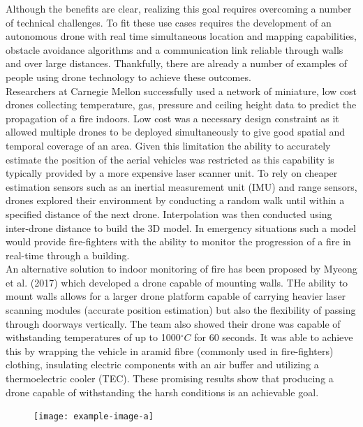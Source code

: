 \documentclass[capstone_report.tex]{subfiles}
\begin{document}
    Although the benefits are clear, realizing this goal requires overcoming a number of technical challenges.  To fit these use cases requires the development of an autonomous drone with real time simultaneous location and mapping capabilities, obstacle avoidance algorithms and a communication link reliable through walls and over large distances.
    Thankfully, there are already a number of examples of people using drone technology to achieve these outcomes.\\

    Researchers at Carnegie Mellon \cite{purohit2011sensorfly} successfully used a network of miniature, low cost drones collecting temperature, gas, pressure and ceiling height data to predict the propagation of a fire indoors.  Low cost was a necessary design constraint as it allowed multiple drones to be deployed simultaneously to give good spatial and temporal coverage of an area.  Given this limitation the ability to accurately estimate the position of the aerial vehicles was restricted as this capability is typically provided by a more expensive laser scanner unit.  To rely on cheaper estimation sensors such as an inertial measurement unit (IMU) and range sensors, drones explored their environment by conducting a random walk until within a specified distance of the next drone.  Interpolation was then conducted using inter-drone distance to build the 3D model.  In emergency situations such a model would provide fire-fighters with the ability to monitor the progression of a fire in real-time through a building.\\

    An alternative solution to indoor monitoring of fire has been proposed by Myeong et al. (2017) \cite{myeong2017development} which developed a drone capable of mounting walls.  THe ability to mount walls allows for a larger drone platform capable of carrying heavier laser scanning modules (accurate position estimation) but also the flexibility of passing through doorways vertically.  The team also showed their drone was capable of withstanding temperatures of up to 1000$^\circ C$ for 60 seconds.  It was able to achieve this by wrapping the vehicle in aramid fibre (commonly used in fire-fighters) clothing, insulating electric components with an air buffer and utilizing a thermoelectric cooler (TEC).  These promising results show that producing a drone capable of withstanding the harsh conditions is an achievable goal.\\

    \begin{figure}[H]  
	\centering
        \texttt{[image: example-image-a]}
        \label{fig:fire_proof_drone}
    \end{figure}
\end{document}
